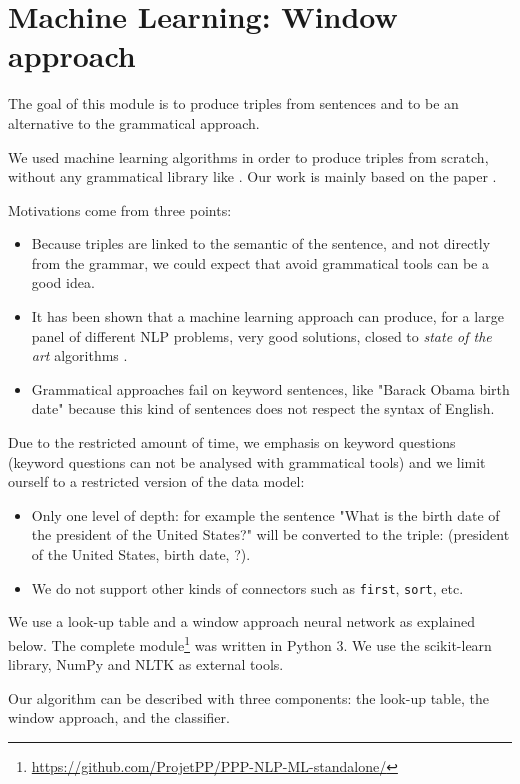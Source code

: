 \section{Machine Learning: Window approach}
\label{mlwindow}

The goal of this module is to produce triples from sentences and to be an alternative to the grammatical approach.

We used machine learning algorithms in order to produce triples from scratch, without any grammatical library like \Stanford. Our work is mainly based on the paper \cite{collobert}.

Motivations come from three points:
\begin{itemize}
\item Because triples are linked to the semantic of the sentence, and not directly from the grammar, we could expect that avoid grammatical tools can be a good idea.
\item It has been shown that a machine learning approach can produce, for a large panel of different NLP problems, very good solutions, closed to \textit{state of the art} algorithms \cite{collobert}.
\item Grammatical approaches fail on keyword sentences, like "Barack Obama birth date" because this kind of sentences does not respect the syntax of English.
\end{itemize}

Due to the restricted amount of time, we emphasis on keyword questions (keyword questions can not be analysed with grammatical tools) and we limit ourself to a restricted version of the data model:
\begin{itemize}
\item Only one level of depth: for example the sentence "What is the birth date of the president of the United States?" will be converted to the triple: (president of the United States, birth date, ?).
\item We do not support other kinds of connectors such as \texttt{first}, \texttt{sort}, etc.
\end{itemize}

We use a look-up table and a window approach neural network as explained below. The complete module\footnote{\url{https://github.com/ProjetPP/PPP-NLP-ML-standalone/}} was written in Python 3. We use the scikit-learn library, NumPy and NLTK as external tools.

Our algorithm can be described with three components: the look-up table, the window approach, and the classifier.

